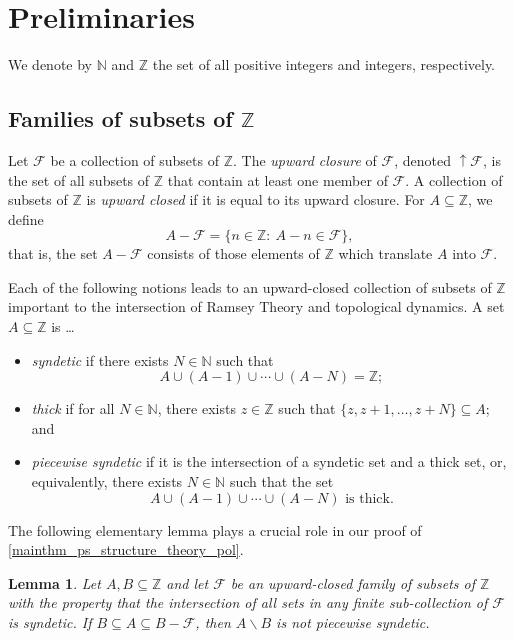 \documentclass{article}
\theoremstyle{plain}
\newtheorem{lemma}[Theorem]{Lemma}
\theoremstyle{claim}
\theoremstyle{definition}
\theoremstyle{plain}
\theoremstyle{plain}
\newcommand{\N}{\mathbb{N}}
\newcommand{\Z}{\mathbb{Z}}
\renewcommand{\setminus}{\backslash}
\newcommand{\1}{\boldsymbol{1}}
\newcommand{\family}{\mathscr{F}}
\begin{document}
\section{Preliminaries}
\label{sec_prelims}

We denote by $\N$ and $\Z$ the set of all positive integers and integers, respectively.

\subsection{Families of subsets of \texorpdfstring{$\Z$}{Z}}
\label{sec_families}

Let $\family$ be a collection of subsets of $\Z$.  The \emph{upward closure} of $\family$, denoted $\uparrow \family$, is the set of all subsets of $\Z$ that contain at least one member of $\family$.  A collection of subsets of $\Z$ is \emph{upward closed} if it is equal to its upward closure.  For $A \subseteq \Z$, we define
\[
    A - \family = \{n \in \Z: \ A - n \in \family\},
\]
that is, the set $A - \family$ consists of those elements of $\Z$ which translate $A$ into $\family$.

Each of the following notions leads to an upward-closed collection of subsets of $\Z$ important to the intersection of Ramsey Theory and topological dynamics.  A set $A \subseteq \Z$ is \dots
\begin{itemize}
    \item \emph{syndetic} if there exists $N \in \N$ such that
    \[
        A \cup (A-1) \cup \cdots \cup (A-N) = \Z;
    \]

    \item \emph{thick} if for all $N \in \N$, there exists $z \in \Z$ such that $\{z, z+1, \ldots, z+N\} \subseteq A$; and

    \item \emph{piecewise syndetic} if it is the intersection of a syndetic set and a thick set, or, equivalently, there exists $N \in \N$ such that the set
    \[
        A \cup (A-1) \cup \cdots \cup (A-N) \text{ is thick}.
    \]
\end{itemize}

The following elementary lemma plays a crucial role in our proof of \cref{mainthm_ps_structure_theory_pol}.

\begin{lemma}
\label{lemma_diff_not_ps}
    Let $A, B \subseteq \Z$ and let $\family$ be an upward-closed family of subsets of $\Z$ with the property that the intersection of all sets in any finite sub-collection of $\family$ is syndetic. If $B \subseteq A \subseteq B - \family$, then $A \setminus B$ is not piecewise syndetic.
\end{lemma}
\end{document}

